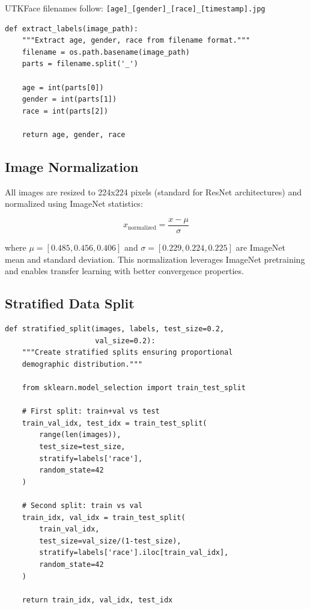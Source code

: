 \documentclass[11pt,a4paper,oneside]{report}
\begin{document}
UTKFace filenames follow: \texttt{[age]\_[gender]\_[race]\_[timestamp].jpg}

\begin{lstlisting}[caption=Label Extraction Implementation]
def extract_labels(image_path):
    """Extract age, gender, race from filename format."""
    filename = os.path.basename(image_path)
    parts = filename.split('_')
    
    age = int(parts[0])
    gender = int(parts[1])
    race = int(parts[2])
    
    return age, gender, race
\end{lstlisting}

\subsection{Image Normalization}

All images are resized to 224x224 pixels (standard for ResNet architectures) and normalized using ImageNet statistics:

\begin{equation}
x_{\text{normalized}} = \frac{x - \mu}{\sigma}
\end{equation}

where $\mu = [0.485, 0.456, 0.406]$ and $\sigma = [0.229, 0.224, 0.225]$ are ImageNet mean and standard deviation. This normalization leverages ImageNet pretraining and enables transfer learning with better convergence properties.

\subsection{Stratified Data Split}

\begin{lstlisting}[caption=Stratified Data Split Implementation]
def stratified_split(images, labels, test_size=0.2, 
                     val_size=0.2):
    """Create stratified splits ensuring proportional 
    demographic distribution."""
    
    from sklearn.model_selection import train_test_split
    
    # First split: train+val vs test
    train_val_idx, test_idx = train_test_split(
        range(len(images)),
        test_size=test_size,
        stratify=labels['race'],
        random_state=42
    )
    
    # Second split: train vs val
    train_idx, val_idx = train_test_split(
        train_val_idx,
        test_size=val_size/(1-test_size),
        stratify=labels['race'].iloc[train_val_idx],
        random_state=42
    )
    
    return train_idx, val_idx, test_idx
\end{lstlisting}
\end{document}
